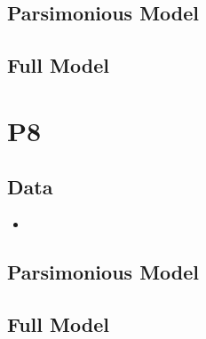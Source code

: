 \documentclass[12pt]{amsart}
\begin{document}
\subsection{Parsimonious Model}

\subsection{Full Model}

\section{P8}
\subsection{Data}
\begin{itemize}
\item
\end{itemize}
\subsection{Parsimonious Model}

\subsection{Full Model}
\end{document}

